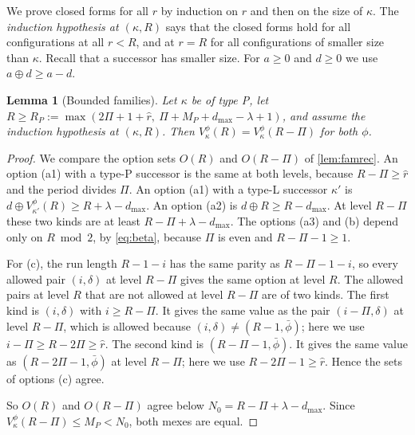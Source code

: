 \documentclass[11pt]{amsart}
\newtheorem{lemma}[theorem]{Lemma}
\theoremstyle{definition}
\theoremstyle{remark}
\begin{document}
We prove closed forms for all $r$ by induction on $r$ and then on the size of $\kappa$. The \emph{induction hypothesis at $(\kappa,R)$} says that the closed forms hold for all configurations at all $r<R$, and at $r=R$ for all configurations of smaller size than $\kappa$. Recall that a successor has smaller size. For $a\ge0$ and $d\ge0$ we use $a\oplus d\ge a-d$.

\begin{lemma}[Bounded families]\label{lem:propP}
Let $\kappa$ be of type P, let $R\ge R_P:=\max(2\Pi+1+\hat r,\ \Pi+M_P+d_{\max}-\lambda+1)$, and assume the induction hypothesis at $(\kappa,R)$. Then $V^\phi_\kappa(R)=V^\phi_\kappa(R-\Pi)$ for both $\phi$.
\end{lemma}

\begin{proof}
We compare the option sets $O(R)$ and $O(R-\Pi)$ of \cref{lem:famrec}. An option (a1) with a type-P successor is the same at both levels, because $R-\Pi\ge\hat r$ and the period divides $\Pi$. An option (a1) with a type-L successor $\kappa'$ is $d\oplus V^\phi_{\kappa'}(R)\ge R+\lambda-d_{\max}$. An option (a2) is $d\oplus R\ge R-d_{\max}$. At level $R-\Pi$ these two kinds are at least $R-\Pi+\lambda-d_{\max}$. The options (a3) and (b) depend only on $R\bmod2$, by \eqref{eq:beta}, because $\Pi$ is even and $R-\Pi-1\ge1$.

For (c), the run length $R-1-i$ has the same parity as $R-\Pi-1-i$, so every allowed pair $(i,\delta)$ at level $R-\Pi$ gives the same option at level $R$. The allowed pairs at level $R$ that are not allowed at level $R-\Pi$ are of two kinds. The first kind is $(i,\delta)$ with $i\ge R-\Pi$. It gives the same value as the pair $(i-\Pi,\delta)$ at level $R-\Pi$, which is allowed because $(i,\delta)\ne(R-1,\bar\phi)$; here we use $i-\Pi\ge R-2\Pi\ge\hat r$. The second kind is $(R-\Pi-1,\bar\phi)$. It gives the same value as $(R-2\Pi-1,\bar\phi)$ at level $R-\Pi$; here we use $R-2\Pi-1\ge\hat r$. Hence the sets of options (c) agree.

So $O(R)$ and $O(R-\Pi)$ agree below $N_0=R-\Pi+\lambda-d_{\max}$. Since $V^\phi_\kappa(R-\Pi)\le M_P<N_0$, both mexes are equal.
\end{proof}
\end{document}
